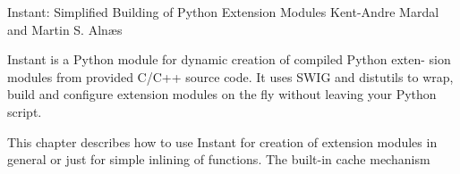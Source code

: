               {Instant: Simplified Building of Python Extension Modules}
              {Kent-Andre Mardal and Martin S. Aln\ae{}s}

\editornote{[mardal-1]}

Instant is a Python module for dynamic creation of compiled Python
exten- sion modules from provided C/C++ source code. It uses SWIG and
distutils to wrap, build and configure extension modules on the fly
without leaving your Python script.

This chapter describes how to use Instant for creation of extension
modules in general or just for simple inlining of functions. The
built-in cache mechanism
